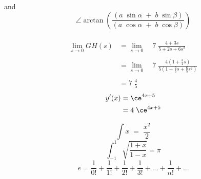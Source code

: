 and \\
\[\angle \arctan(\frac{(a \; \sin \alpha \; + \; b \; \sin \beta)}{(a \; \cos \alpha \; + \; b \; \cos \beta)})\] \\
\begin{align*}
	\lim_{s \to 0}{GH(s)} & = \lim_{s \to 0} \quad 7 \; \frac{4+3s}{5+2s+6s^2} \\ \\
	& = \lim_{s \to 0} \quad 7 \; \frac{4(1+\frac{3}{4}s)}{5(1+\frac{2}{5}s+\frac{6}{5}s^2)} \\ \\
	& = 7 \; \frac{4}{5}
\end{align*}
\begin{align*}
	y'(x) &= \ce^{4x+5} \\
	&= 4 \; \ce^{4x+5}
\end{align*}

\newpage

\newpage
\[\int x \; = \; \frac{x^2}{2}\]
\[\int_{-1}^{1}\sqrt{\frac{1+x}{1-x}}=\pi\]
\[e=\frac{1}{0!}+\frac{1}{1!}+\frac{1}{2!}+\frac{1}{3!}+...+\frac{1}{n!}+...\]
\newpage
